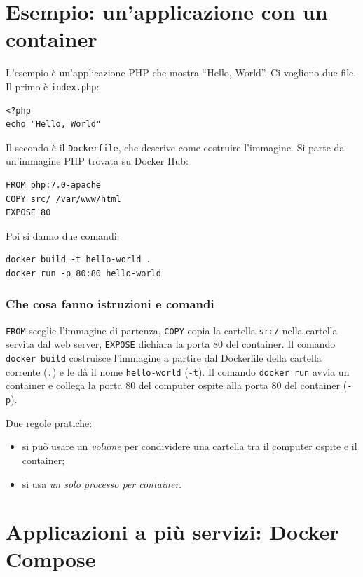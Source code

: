 \section{Esempio: un'applicazione con un container}
\label{sec:container-hello}

L'esempio è un'applicazione PHP che mostra ``Hello, World''. Ci vogliono due file. Il primo è \texttt{index.php}:

{\small
\begin{verbatim}
<?php
echo "Hello, World"
\end{verbatim}
}

Il secondo è il \texttt{Dockerfile}, che descrive come costruire l'immagine. Si parte da un'immagine PHP trovata su
Docker Hub:

{\small
\begin{verbatim}
FROM php:7.0-apache
COPY src/ /var/www/html
EXPOSE 80
\end{verbatim}
}

Poi si danno due comandi:

{\small
\begin{verbatim}
docker build -t hello-world .
docker run -p 80:80 hello-world
\end{verbatim}
}

\subsubsection{Che cosa fanno istruzioni e comandi\aggiunta}
\texttt{FROM} sceglie l'immagine di partenza, \texttt{COPY} copia la cartella \texttt{src/} nella cartella servita dal
web server, \texttt{EXPOSE} dichiara la porta 80 del container. Il comando \texttt{docker build} costruisce
l'immagine a partire dal Dockerfile della cartella corrente (\texttt{.}) e le dà il nome \texttt{hello-world}
(\texttt{-t}). Il comando \texttt{docker run} avvia un container e collega la porta 80 del computer ospite alla porta
80 del container (\texttt{-p}).

Due regole pratiche:
\begin{itemize}
  \item si può usare un \emph{volume} per condividere una cartella tra il computer ospite e il container;
  \item si usa \emph{un solo processo per container}.
\end{itemize}

\section{Applicazioni a più servizi: Docker Compose}
\label{sec:container-compose}

